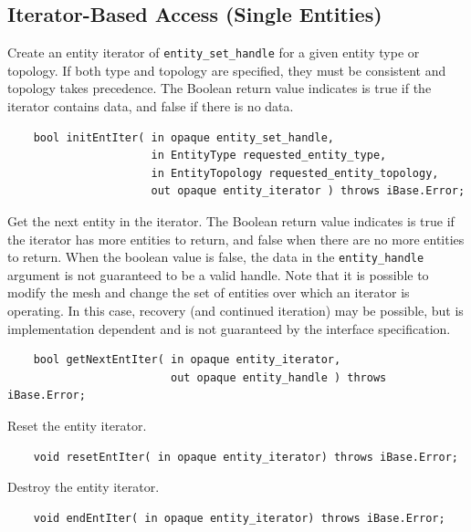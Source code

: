 \documentclass{article}
\begin{document}
\subsection{Iterator-Based Access (Single Entities)}

Create an entity iterator of {\tt entity\_set\_handle} for a given entity 
type or topology. If both type and topology are specified, they 
must be consistent and topology takes precedence. The Boolean 
return value indicates is true if the iterator contains data, 
and false if there is no data. 

\begin{verbatim}
    bool initEntIter( in opaque entity_set_handle, 
                      in EntityType requested_entity_type,  
                      in EntityTopology requested_entity_topology, 
                      out opaque entity_iterator ) throws iBase.Error;
\end{verbatim}

Get the next entity in the iterator.  The Boolean return value 
indicates is true if the iterator has more entities to return, 
and false when there are no more entities to return. When the 
boolean value is false, the data in the {\tt entity\_handle} argument 
is not guaranteed to be a valid handle. Note that it is possible 
to modify the mesh and change the set of entities over which 
an iterator is operating. In this case, recovery (and continued 
iteration) may be possible, but is implementation dependent and 
is not guaranteed by the interface specification.  

\begin{verbatim}
    bool getNextEntIter( in opaque entity_iterator, 
                         out opaque entity_handle ) throws iBase.Error;
\end{verbatim}

Reset the entity iterator.

\begin{verbatim}
    void resetEntIter( in opaque entity_iterator) throws iBase.Error;
\end{verbatim}

Destroy the entity iterator.

\begin{verbatim}
    void endEntIter( in opaque entity_iterator) throws iBase.Error;
\end{verbatim}


\end{document}
